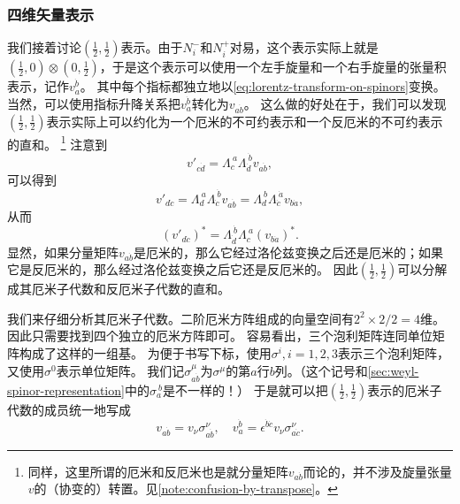 \subsubsection{四维矢量表示}\label{sec:4-vector-representation}


我们接着讨论$(\frac{1}{2}, \frac{1}{2})$表示。由于$N_i^-$和$N_i^+$对易，这个表示实际上就是$(\frac{1}{2}, 0) \otimes (0, \frac{1}{2})$，于是这个表示可以使用一个左手旋量和一个右手旋量的张量积表示，记作$v_a^{\dot{b}}$。
其中每个指标都独立地以\eqref{eq:lorentz-transform-on-spinors}变换。
当然，可以使用指标升降关系把$v_a^{\dot{b}}$转化为$v_{a\dot{b}}$。
这么做的好处在于，我们可以发现$(\frac{1}{2}, \frac{1}{2})$表示实际上可以约化为一个厄米的不可约表示和一个反厄米的不可约表示的直和。%
\footnote{同样，这里所谓的厄米和反厄米也是就分量矩阵$v_{a\dot{b}}$而论的，并不涉及旋量张量$v$的（协变的）转置。见\autoref{note:confusion-by-transpose}。}
注意到
\[
    v'_{c\dot{d}} = \Lambda_c^{\ a} \Lambda_{\dot{d}}^{\ \dot{b}} v_{a\dot{b}},
\]
可以得到
\[
    v'_{d\dot{c}} = \Lambda_d^{\ a} \Lambda_{\dot{c}}^{\ \dot{b}} v_{a\dot{b}} = \Lambda_d^{\ b} \Lambda_{\dot{c}}^{\ \dot{a}} v_{b\dot{a}},
\]
从而
\[
    (v'_{d\dot{c}})^* = \Lambda_{\dot{d}}^{\ \dot{b}} \Lambda_{c}^{\ a} (v_{b\dot{a}})^*.
\]
显然，如果分量矩阵$v_{a\dot{b}}$是厄米的，那么它经过洛伦兹变换之后还是厄米的；如果它是反厄米的，那么经过洛伦兹变换之后它还是反厄米的。
因此$(\frac{1}{2}, \frac{1}{2})$可以分解成其厄米子代数和反厄米子代数的直和。

我们来仔细分析其厄米子代数。二阶厄米方阵组成的向量空间有$2^2 \times 2 / 2 = 4$维。因此只需要找到四个独立的厄米方阵即可。
容易看出，三个泡利矩阵连同单位矩阵构成了这样的一组基。
为便于书写下标，使用$\sigma^i, i=1, 2, 3$表示三个泡利矩阵，又使用$\sigma^0$表示单位矩阵。
我们记$\sigma^\mu_{a\dot{b}}$为$\sigma^\mu$的第$a$行$b$列。（这个记号和\autoref{sec:weyl-spinor-representation}中的$\sigma_a^{\ b}$是不一样的！）
于是就可以把$(\frac{1}{2}, \frac{1}{2})$表示的厄米子代数的成员统一地写成
\begin{equation}
    v_{a\dot{b}} = v_\nu \sigma^\nu_{a\dot{b}}, \quad v_a^{\dot{b}} = \epsilon^{\dot{b} \dot{c}} v_\nu \sigma^\nu_{a \dot{c}}.
    \label{eq:vector-is-spin-tensor}
\end{equation}


